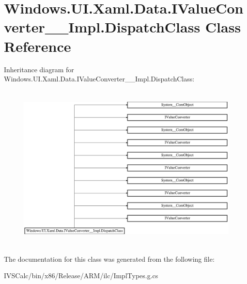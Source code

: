 \hypertarget{class_windows_1_1_u_i_1_1_xaml_1_1_data_1_1_i_value_converter_____impl_1_1_dispatch_class}{}\section{Windows.\+U\+I.\+Xaml.\+Data.\+I\+Value\+Converter\+\_\+\+\_\+\+Impl.\+Dispatch\+Class Class Reference}
\label{class_windows_1_1_u_i_1_1_xaml_1_1_data_1_1_i_value_converter_____impl_1_1_dispatch_class}
Inheritance diagram for Windows.\+U\+I.\+Xaml.\+Data.\+I\+Value\+Converter\+\_\+\+\_\+\+Impl.\+Dispatch\+Class\+:\begin{figure}[H]
\begin{center}
\leavevmode
\includegraphics[height=8.461538cm]{class_windows_1_1_u_i_1_1_xaml_1_1_data_1_1_i_value_converter_____impl_1_1_dispatch_class}
\end{center}
\end{figure}


The documentation for this class was generated from the following file\+:\begin{DoxyCompactItemize}
\item 
I\+V\+S\+Calc/bin/x86/\+Release/\+A\+R\+M/ilc/Impl\+Types.\+g.\+cs\end{DoxyCompactItemize}
